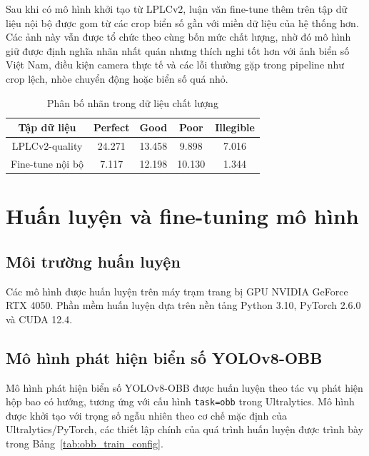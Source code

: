 \documentclass[../DoAn.tex]{subfiles}
\begin{document}
Sau khi có mô hình khởi tạo từ LPLCv2, luận văn fine-tune thêm trên tập dữ liệu nội bộ được gom từ các crop biển số gần với miền dữ liệu của hệ thống hơn. Các ảnh này vẫn được tổ chức theo cùng bốn mức chất lượng, nhờ đó mô hình giữ được định nghĩa nhãn nhất quán nhưng thích nghi tốt hơn với ảnh biển số Việt Nam, điều kiện camera thực tế và các lỗi thường gặp trong pipeline như crop lệch, nhòe chuyển động hoặc biển số quá nhỏ.

\begin{table}[htbp]
\centering
\caption{Phân bố nhãn trong dữ liệu chất lượng}
\begin{tabular}{|c|c|c|c|c|}
\hline
Tập dữ liệu & Perfect & Good & Poor & Illegible \\
\hline
LPLCv2-quality & 24.271 & 13.458 & 9.898 & 7.016 \\
Fine-tune nội bộ & 7.117 & 12.198 & 10.130 & 1.344 \\
\hline
\end{tabular}
\end{table}

\vspace{-1em}



\section{Huấn luyện và fine-tuning mô hình}
\label{section:4.2_training}

\subsection{Môi trường huấn luyện}
\label{subsection:4.2.1_env}
Các mô hình được huấn luyện trên máy trạm trang bị GPU NVIDIA GeForce RTX 4050. Phần mềm huấn luyện dựa trên nền tảng Python 3.10, PyTorch 2.6.0 và CUDA 12.4. 
\subsection{Mô hình phát hiện biển số YOLOv8-OBB}
\label{subsection:4.2.2_obb}

Mô hình phát hiện biển số YOLOv8-OBB được huấn luyện theo tác vụ phát hiện hộp bao có hướng, tương ứng với cấu hình \texttt{task=obb} trong Ultralytics. Mô hình được khởi tạo với trọng số ngẫu nhiên theo cơ chế mặc định của Ultralytics/PyTorch, các thiết lập chính của quá trình huấn luyện được trình bày trong Bảng~\ref{tab:obb_train_config}.
\end{document}
